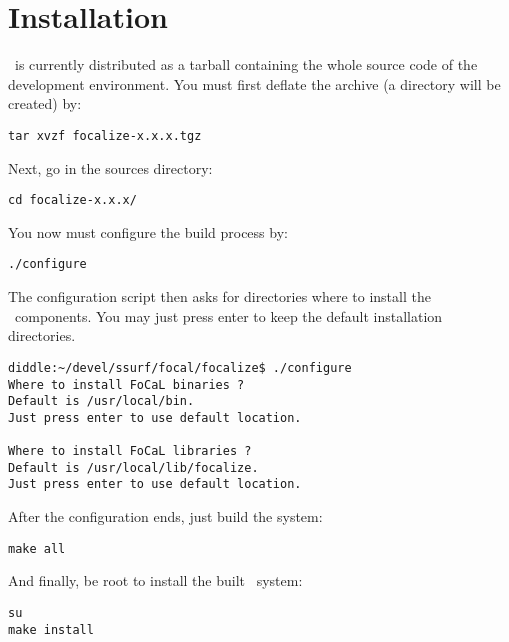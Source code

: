 \section{Installation}
\label{installation}
\focal\ is currently distributed as a tarball containing the whole
source code of the development environment. You must first deflate the
archive (a directory will be created) by:
\begin{center}
{\tt tar xvzf focalize-x.x.x.tgz}
\end{center}
Next, go in the sources directory:
\begin{center}
{\tt cd focalize-x.x.x/}
\end{center}
You now must configure the build process by:
\begin{center}
{\tt ./configure}
\end{center}
The configuration script then asks for directories where to install
the \focal\ components. You may just press enter to keep the default
installation directories.
\begin{verbatim}
diddle:~/devel/ssurf/focal/focalize$ ./configure 
Where to install FoCaL binaries ?
Default is /usr/local/bin.
Just press enter to use default location.

Where to install FoCaL libraries ?
Default is /usr/local/lib/focalize.
Just press enter to use default location.
\end{verbatim}
After the configuration ends, just build the system:
\begin{center}
{\tt make all}
\end{center}
And finally, be root to install the built \focal\ system:
\begin{center}
{\tt su}\\
{\tt make install}
\end{center}
